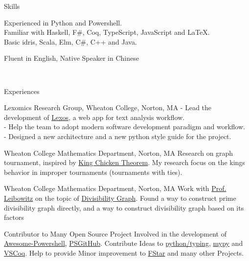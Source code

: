 \documentclass[]{resume-knyte}
\begin{document}
\begin{topic}{Skills}


    {Experienced in Python and Powershell.\\
    Familiar with Haskell, F\#, Coq, TypeScript, JavaScript and \LaTeX{}.\\
    Basic idris, Scala, Elm, C\#, C++ and Java.}

    {Fluent in English, Native Speaker in Chinese}

    \\ %
\end{topic}


\begin{topic}{Experiences}


    {Lexomics Research Group, Wheaton College, Norton, MA}
    {- Lead the development of \href{https://github.com/WheatonCS/Lexos}{Lexos}, a web app for text analysis workflow.\\
    - Help the team to adopt modern software development paradigm and workflow.\\
    - Designed a new architecture and a new python style guide for the project.}

    {Wheaton College Mathematics Department, Norton, MA}
    {Research on graph tournament, inspired by \href{https://www.maa.org/sites/default/files/pdf/upload_library/22/Allendoerfer/1981/0025570x.di021114.02p00982.pdf}{King Chicken Theorem}.
    My research focus on the kings behavior in improper tournaments (tournaments with ties).}


    {Wheaton College Mathematics Department, Norton, MA}
    {Work with \href{https://wheatoncollege.edu/academics/faculty-directory/rochelle-shelly-leibowitz/}{Prof. Leibowitz}
    on the topic of \href{https://chantisnake.github.io/2016/05/22/explain-the-divisibility-graph/}{Divisibility Graph}.
    Found a way to construct prime divisibility graph directly, and a way to construct divisibility graph based on its factors}

    {Contributor to Many Open Source Project}
    {Involved in the development of \href{https://github.com/janikvonrotz/awesome-powershell}{Awesome-Powershell}, \href{https://github.com/pcgeek86/PSGitHub}{PSGitHub}.
    Contribute Ideas to \href{https://github.com/python/typing}{python/typing}, \href{https://github.com/python/mypy}{mypy} and \href{https://github.com/siegebell/vscoq}{VSCoq}.
    Help to provide Minor improvement to \href{https://github.com/FStarLang/FStar}{FStar} and many other Projects.}

\\ %
\end{topic}
\end{document}
